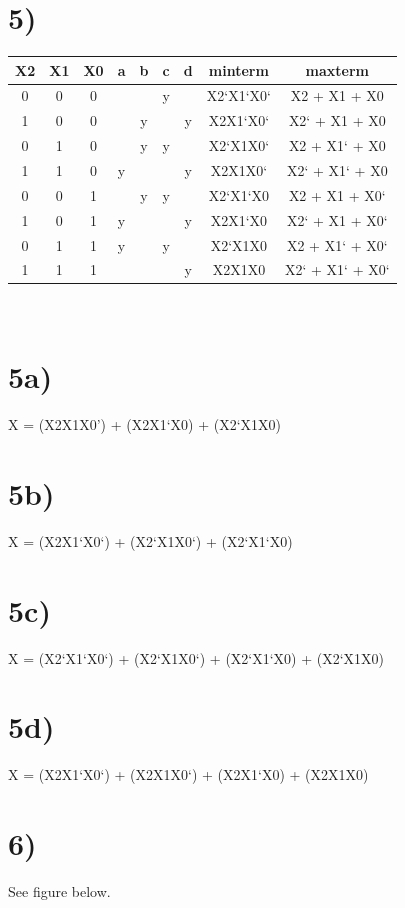 \documentclass[a4paper,11pt]{article}
\begin{document}
\section*{5)}
\begin{tabular}{| c | c | c | c | c | c | c | c | c | }
  \hline	
       X2 & X1 & X0  & a & b & c & d & minterm & maxterm \\  \hline
       0 & 0 & 0  &  &  & y &   & X2`X1`X0` & X2 + X1 + X0 \\  \hline
       1 & 0 & 0  &  & y &  & y & X2X1`X0` & X2` + X1 + X0  \\  \hline
       0 & 1 & 0  &  & y & y &   & X2`X1X0` & X2 + X1` + X0 \\  \hline
       1 & 1 & 0  & y &  &  &  y & X2X1X0` & X2` + X1` + X0 \\  \hline
       0 & 0 & 1  &  & y & y &   & X2`X1`X0 & X2 + X1 + X0` \\  \hline
       1 & 0 & 1  & y &  &  &  y & X2X1`X0 & X2` + X1 + X0` \\  \hline
       0 & 1 & 1  & y &  & y &   & X2`X1X0 & X2 + X1` + X0` \\  \hline
       1 & 1 & 1  &  &  &  &  y & X2X1X0 & X2` + X1` + X0` \\  \hline
\end{tabular} \\

\section*{5a)}
X = (X2X1X0') + (X2X1`X0) + (X2`X1X0)

\section*{5b)}
X = (X2X1`X0`) + (X2`X1X0`) + (X2`X1`X0)

\section*{5c)}
X = (X2`X1`X0`) + (X2`X1X0`) + (X2`X1`X0) + (X2`X1X0)

\section*{5d)}
X = (X2X1`X0`) + (X2X1X0`) + (X2X1`X0) + (X2X1X0)


\section*{6)}
See figure below.
\end{document}
